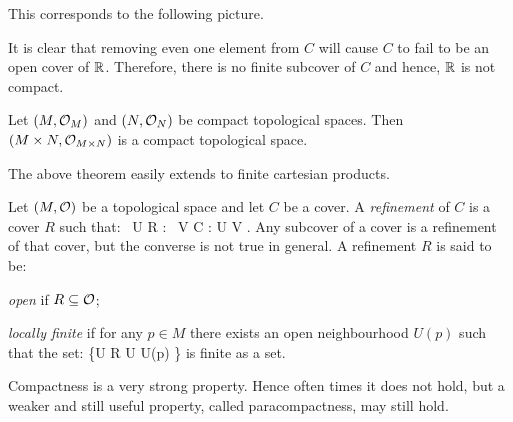 This corresponds to the following picture.

\begin{figure}[h!]
\centering
{}
\end{figure}

It is clear that removing even one element from $C$ will cause $C$ to fail to be an open cover of $\mathbb{R}$. Therefore, there is no finite subcover of $C$ and hence, $\mathbb{R}$ is not compact.
\ee

\bt
Let $(M,\mathcal{O}_M)$ and $(N,\mathcal{O}_N)$ be compact topological spaces. Then $(M\times N,\mathcal{O}_{M\times N})$ is a compact topological space.
\et

The above theorem easily extends to finite cartesian products. 

\bd
Let $(M,\mathcal{O})$ be a topological space and let $C$ be a cover. A \emph{refinement} of $C$ is a cover $R$ such that:
\bse
\forall \, U \in R : \exists \, V \in C : U \se V .
\ese
\ed
Any subcover of a cover is a refinement of that cover, but the converse is not true in general. A refinement $R$ is said to be:
\bit
\item \emph{open} if $R\subseteq \mathcal{O}$;
\item \emph{locally finite} if for any $p\in M$ there exists an open neighbourhood $U(p)$ such that the set:
\bse
\{U \in R \mid U \cap U(p) \neq \vn\}
\ese
is finite as a set.
\eit

Compactness is a very strong property. Hence often times it does not hold, but a weaker and still useful property, called paracompactness, may still hold.


